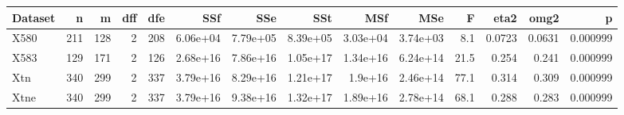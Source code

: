 \begin{tabular}{lrrrrrrrrrrrrr}
\hline
Dataset & n & m & dff & dfe & SSf & SSe & SSt & MSf & MSe & F & eta2 & omg2 & p \\
\hline
X580 & 211 & 128 & 2 & 208 & 6.06e+04 & 7.79e+05 & 8.39e+05 & 3.03e+04 & 3.74e+03 & 8.1 & 0.0723 & 0.0631 & 0.000999 \\
X583 & 129 & 171 & 2 & 126 & 2.68e+16 & 7.86e+16 & 1.05e+17 & 1.34e+16 & 6.24e+14 & 21.5 & 0.254 & 0.241 & 0.000999 \\
Xtn & 340 & 299 & 2 & 337 & 3.79e+16 & 8.29e+16 & 1.21e+17 & 1.9e+16 & 2.46e+14 & 77.1 & 0.314 & 0.309 & 0.000999 \\
Xtne & 340 & 299 & 2 & 337 & 3.79e+16 & 9.38e+16 & 1.32e+17 & 1.89e+16 & 2.78e+14 & 68.1 & 0.288 & 0.283 & 0.000999 \\
\hline
\end{tabular}
